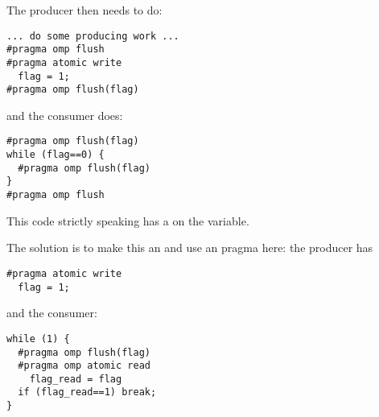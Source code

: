 The producer then needs to do:
\begin{lstlisting}
... do some producing work ...
#pragma omp flush
#pragma atomic write
  flag = 1;
#pragma omp flush(flag)
\end{lstlisting}
and the consumer does:
\begin{lstlisting}
#pragma omp flush(flag)
while (flag==0) {
  #pragma omp flush(flag)
}
#pragma omp flush
\end{lstlisting}
This code strictly speaking has a  on the  variable.

The solution is to make this an  and
use an  pragma here: the producer has
\begin{lstlisting}
#pragma atomic write
  flag = 1;
\end{lstlisting}
and the consumer:
\begin{lstlisting}
while (1) {
  #pragma omp flush(flag)
  #pragma omp atomic read
    flag_read = flag
  if (flag_read==1) break;
}
\end{lstlisting}

